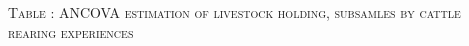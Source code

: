 \hspace{-1cm}\begin{minipage}[t]{14cm}
\hfil\textsc{\normalsize Table \thetable: ANCOVA estimation of livestock holding, subsamles by cattle rearing experiences\label{tab ANCOVA net assets experience 1}}\\
\setlength{\tabcolsep}{1pt}
\setlength{\baselineskip}{8pt}
\renewcommand{\arraystretch}{.52}
\hfil{}\\
\end{minipage}

